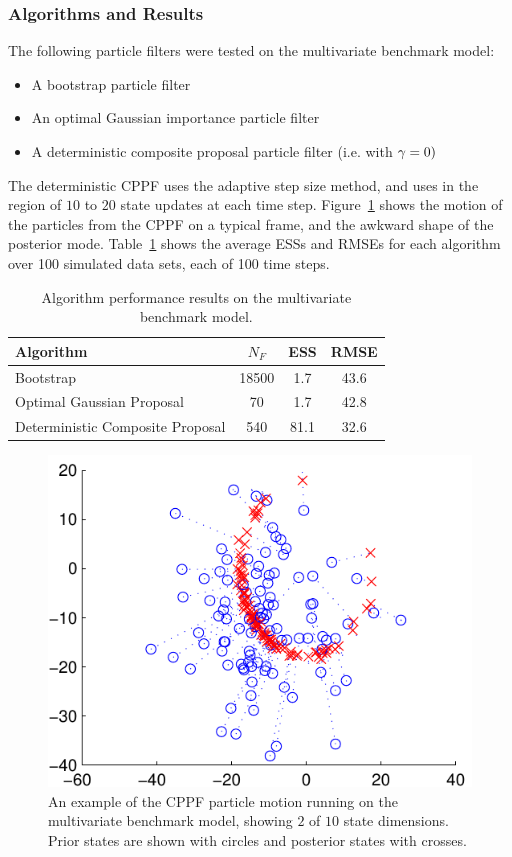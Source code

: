 \documentclass{article}
\begin{document}
\subsubsection{Algorithms and Results}

The following particle filters were tested on the multivariate benchmark model:
\begin{itemize}
  \item A bootstrap particle filter
  \item An optimal Gaussian importance particle filter
  \item A deterministic composite proposal particle filter (i.e. with $\gamma=0)$
\end{itemize}

The deterministic CPPF uses the adaptive step size method, and uses in the region of $10$ to $20$ state updates at each time step. Figure~\ref{fig:nlng_example_frame} shows the motion of the particles from the CPPF on a typical frame, and the awkward shape of the posterior mode. Table~\ref{tab:nlng_results} shows the average ESSs and RMSEs for each algorithm over 100 simulated data sets, each of 100 time steps.
%
\begin{table}
\centering
\begin{tabular}{l||c|c|c}
Algorithm                                & $N_F$ & ESS  & RMSE \\
\hline
Bootstrap                                & 18500 &  1.7 & 43.6 \\
Optimal Gaussian Proposal                &    70 &  1.7 & 42.8 \\
Deterministic Composite Proposal         &   540 & 81.1 & 32.6 \\
\end{tabular}
\caption{Algorithm performance results on the multivariate benchmark model.}
\label{tab:nlng_results}
\end{table}
%
\begin{figure}
\centering
\includegraphics[width=0.7\columnwidth]{nlng_example_frame_deter.pdf}
\caption{An example of the CPPF particle motion running on the multivariate benchmark model, showing $2$ of $10$ state dimensions. Prior states are shown with circles and posterior states with crosses.}
\label{fig:nlng_example_frame}
\end{figure}
\end{document}
